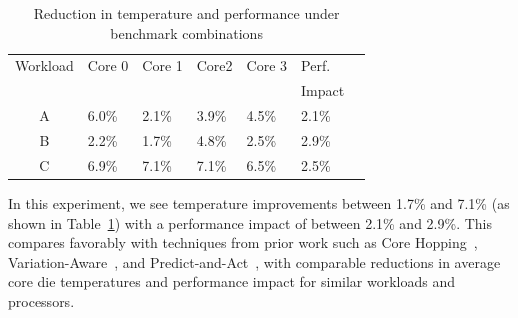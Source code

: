\documentclass[times, 10pt,twocolumn]{IEEEtran}
\begin{document}
\begin{table}[!bp] 
\centering
  \caption{Reduction in temperature and performance under benchmark combinations}
  \label{tab:mixwkload}
  \begin{tabular}{cllllll} 
\hline
Workload & Core 0 & Core 1 & Core2 & Core 3 & Perf. \\
 &  &  &  &  & Impact \\
\hline
\hline
A & 6.0\% & 2.1\% & 3.9\% & 4.5\% & 2.1\% \\
B & 2.2\% & 1.7\% & 4.8\% & 2.5\% & 2.9\% \\
C & 6.9\% & 7.1\% & 7.1\% & 6.5\% & 2.5\% \\
\hline
  \end{tabular}

\end{table} 
In this experiment, we see temperature improvements between
1.7\% and 7.1\% (as shown in Table~\ref{tab:mixwkload}) with a
performance impact of between 2.1\% and 2.9\%.  This compares favorably
with techniques from prior work such as Core Hopping~\cite{Choi2007},
Variation-Aware~\cite{Kursun2008}, and Predict-and-Act~\cite{Ayoub2009},
with comparable reductions in average core die temperatures and
performance impact for similar workloads and processors.
\end{document}

